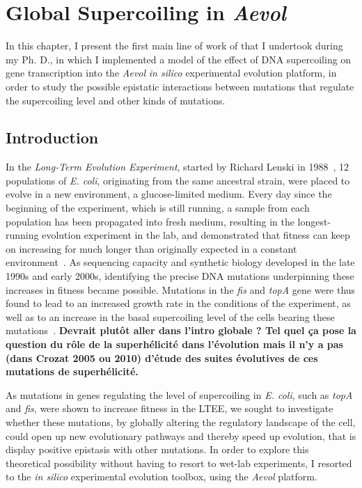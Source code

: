 \chapter{Global Supercoiling in \emph{Aevol}}
\label{chap:aevol}

In this chapter, I present the first main line of work of that I undertook during my Ph. D., in which I implemented a model of the effect of DNA supercoiling on gene transcription into the \emph{Aevol} \emph{in silico} experimental evolution platform, in order to study the possible epistatic interactions between mutations that regulate the supercoiling level and other kinds of mutations.

\section{Introduction}
\label{sec:aevol:intro}

In the \emph{Long-Term Evolution Experiment}, started by Richard Lenski in 1988~\citep{lenski1991}, 12 populations of \emph{E. coli}, originating from the same ancestral strain, were placed to evolve in a new environment, a glucose-limited medium.
Every day since the beginning of the experiment, which is still running, a sample from each population has been propagated into fresh medium, resulting in the longest-running evolution experiment in the lab, and demonstrated that fitness can keep on increasing for much longer than originally expected in a constant environment~\citep{good2017}.
As sequencing capacity and synthetic biology developed in the late 1990s and early 2000s, identifying the precise DNA mutations underpinning these increases in fitness became possible.
Mutations in the \emph{fis} and \emph{topA} gene were thus found to lead to an increased growth rate in the conditions of the experiment, as well as to an increase in the basal supercoiling level of the cells bearing these mutations~\citep{crozat2005}.
\textbf{Devrait plutôt aller dans l'intro globale ?
Tel quel ça pose la question du rôle de la superhélicité dans l'évolution mais il n'y a pas (dans Crozat 2005 ou 2010) d'étude des suites évolutives de ces mutations de superhélicité.}

As mutations in genes regulating the level of supercoiling in \emph{E. coli}, such as \emph{topA} and \emph{fis}, were shown to increase fitness in the LTEE, we sought to investigate whether these mutations, by globally altering the regulatory landscape of the cell, could open up new evolutionary pathways and thereby speed up evolution, that is display positive epistasis with other mutations.
In order to explore this theoretical possibility without having to resort to wet-lab experiments, I resorted to the \emph{in silico} experimental evolution toolbox, using the \emph{Aevol} platform.


